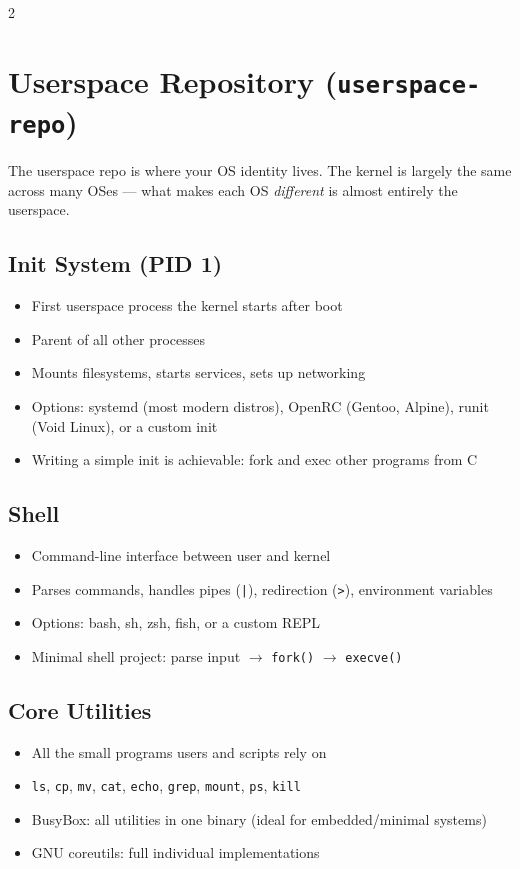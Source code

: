 2\documentclass[11pt,a4paper]{article}
\begin{document}
\section{Userspace Repository (\texttt{userspace-repo})}

The userspace repo is where your OS identity lives. The kernel is largely the same across many OSes --- what makes each OS \textit{different} is almost entirely the userspace.

\subsection{Init System (PID 1)}
\begin{itemize}[noitemsep]
  \item First userspace process the kernel starts after boot
  \item Parent of all other processes
  \item Mounts filesystems, starts services, sets up networking
  \item Options: systemd (most modern distros), OpenRC (Gentoo, Alpine), runit (Void Linux), or a custom init
  \item Writing a simple init is achievable: fork and exec other programs from C
\end{itemize}

\subsection{Shell}
\begin{itemize}[noitemsep]
  \item Command-line interface between user and kernel
  \item Parses commands, handles pipes (\texttt{|}), redirection (\texttt{>}), environment variables
  \item Options: bash, sh, zsh, fish, or a custom REPL
  \item Minimal shell project: parse input $\rightarrow$ \texttt{fork()} $\rightarrow$ \texttt{execve()}
\end{itemize}

\subsection{Core Utilities}
\begin{itemize}[noitemsep]
  \item All the small programs users and scripts rely on
  \item \texttt{ls}, \texttt{cp}, \texttt{mv}, \texttt{cat}, \texttt{echo}, \texttt{grep}, \texttt{mount}, \texttt{ps}, \texttt{kill}
  \item BusyBox: all utilities in one binary (ideal for embedded/minimal systems)
  \item GNU coreutils: full individual implementations
\end{itemize}
\end{document}
